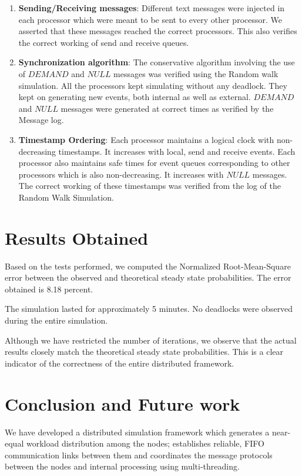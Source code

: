 \documentclass[12pt,a4paper]{article}
\begin{document}
\begin{enumerate}
	\item \textbf{Sending/Receiving messages}: Different text messages were injected in each processor which were meant to be sent to every other processor. We asserted that these messages reached the correct processors. This also verifies the correct working of send and receive queues.
	\item \textbf{Synchronization algorithm}: The conservative algorithm involving the use of $DEMAND$ and $NULL$ messages was verified using the Random walk simulation. All the processors kept simulating without any deadlock. They kept on generating new events, both internal as well as external. $DEMAND$ and $NULL$ messages were generated at correct times as verified by the Message log.
	\item \textbf{Timestamp Ordering}: Each processor maintains a logical clock with non-decreasing timestamps. It increases with local, send and receive events. Each processor also maintains safe times for event queues corresponding to other processors which is also non-decreasing. It increases with $NULL$ messages. The  correct working of these timestamps was verified from the log of the Random Walk Simulation.
\end{enumerate}

\section{Results Obtained}
Based on the tests performed, we computed the Normalized Root-Mean-Square error between the observed and theoretical steady state probabilities. The error obtained is 8.18 percent.

The simulation lasted for approximately 5 minutes. No deadlocks were observed during the entire simulation.

Although we have restricted the number of iterations, we observe that the actual results closely match the theoretical steady state probabilities. This is a clear indicator of the correctness of the entire distributed framework.

\section{Conclusion and Future work}
We have developed a distributed simulation framework which generates a near-equal workload distribution among the nodes; establishes reliable, FIFO communication links between them and coordinates the message protocols between the nodes and internal processing using multi-threading.
\end{document}
